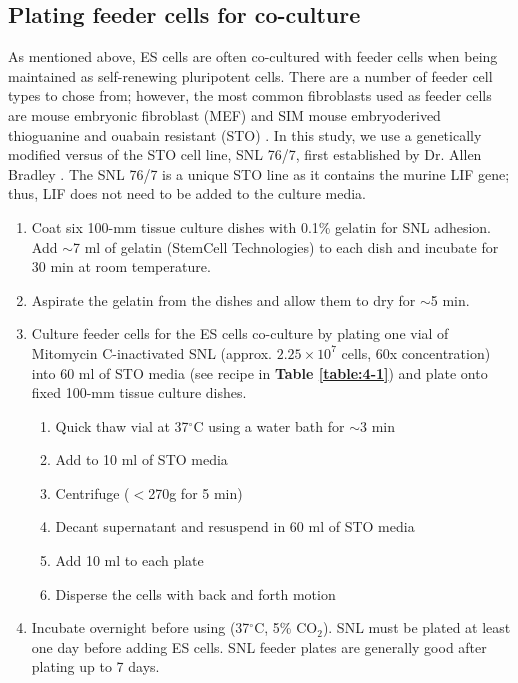 \subsection{Plating feeder cells for co-culture}

As mentioned above, ES cells are often co-cultured with feeder cells when being maintained as self-renewing pluripotent cells. There are a number of feeder cell types to chose from; however, the most common fibroblasts used as feeder cells are mouse embryonic fibroblast (MEF) and SIM mouse embryoderived thioguanine and ouabain resistant (STO) \cite{Thomas1985,Gail1981}. In this study, we use a genetically modified versus of the STO cell line, SNL 76/7, first established by Dr. Allen Bradley \cite{McMahon1990}. The SNL 76/7 is a unique STO line as it contains the murine LIF gene; thus, LIF does not need to be added to the culture media. 

\begin{enumerate}
\item Coat six 100-mm tissue culture dishes with 0.1\% gelatin for SNL adhesion. Add $\sim$7 ml of gelatin (StemCell Technologies) to each dish and incubate for 30 min at room temperature.
\item Aspirate the gelatin from the dishes and allow them to dry for $\sim$5 min.
\item Culture feeder cells for the ES cells co-culture by plating one vial of Mitomycin C-inactivated SNL (approx. \(2.25 \times 10^7\) cells, 60x concentration) into 60 ml of STO media (see recipe in \textbf{Table \ref{table:4-1}}) and plate onto fixed 100-mm tissue culture dishes.
  \begin{enumerate}
  \item Quick thaw vial at 37$^{\circ}$C using a water bath for $\sim$3 min
  \item Add to 10 ml of STO media
  \item Centrifuge (\( < \)270g for 5 min)
  \item Decant supernatant and resuspend in 60 ml of STO media
  \item Add 10 ml to each plate
  \item Disperse the cells with back and forth motion
  \end{enumerate}
\item Incubate overnight before using (37$^{\circ}$C, 5\% CO\(_2\)). SNL must be plated at least one day before adding ES cells. SNL feeder plates are generally good after plating up to 7 days. 
\end{enumerate}


